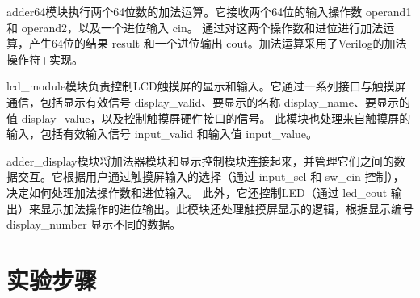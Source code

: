 \documentclass{ctexart}
\begin{document}
adder64模块执行两个64位数的加法运算。它接收两个64位的输入操作数 operand1 和 operand2，以及一个进位输入 cin。
通过对这两个操作数和进位进行加法运算，产生64位的结果 result 和一个进位输出 cout。加法运算采用了Verilog的加法操作符+实现。

lcd\_module模块负责控制LCD触摸屏的显示和输入。它通过一系列接口与触摸屏通信，包括显示有效信号 display\_valid、要显示的名称 display\_name、要显示的值 display\_value，以及控制触摸屏硬件接口的信号。
此模块也处理来自触摸屏的输入，包括有效输入信号 input\_valid 和输入值 input\_value。

adder\_display模块将加法器模块和显示控制模块连接起来，并管理它们之间的数据交互。它根据用户通过触摸屏输入的选择（通过 input\_sel 和 sw\_cin 控制），决定如何处理加法操作数和进位输入。
此外，它还控制LED（通过 led\_cout 输出）来显示加法操作的进位输出。此模块还处理触摸屏显示的逻辑，根据显示编号 display\_number 显示不同的数据。
\section{实验步骤}
\end{document}
